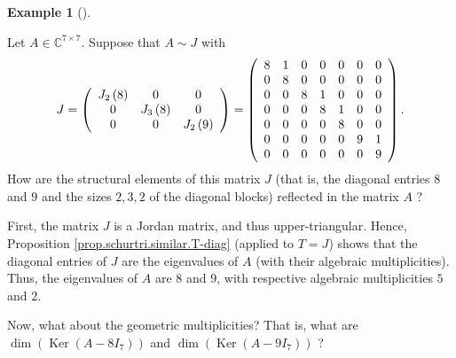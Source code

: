 \documentclass[numbers=enddot,12pt,final,onecolumn,notitlepage]{scrartcl}%
\numberwithin{exer}{subsection}
\theoremstyle{definition}
\newtheorem{exam}[theo]{Example}
\newenvironment{example}[1][]
{\begin{exam}[#1]\begin{leftbar}}
{\end{leftbar}\end{exam}}
\begin{document}
\begin{example}
\label{exa.jnf.unique.exa1}Let $A\in\mathbb{C}^{7\times7}$. Suppose that
$A\sim J$ with%
\[
J=\left(
\begin{array}
[c]{ccc}%
J_{2}\left(  8\right)  & 0 & 0\\
0 & J_{3}\left(  8\right)  & 0\\
0 & 0 & J_{2}\left(  9\right)
\end{array}
\right)  =\left(
\begin{array}
[c]{ccccccc}%
8 & 1 & 0 & 0 & 0 & 0 & 0\\
0 & 8 & 0 & 0 & 0 & 0 & 0\\
0 & 0 & 8 & 1 & 0 & 0 & 0\\
0 & 0 & 0 & 8 & 1 & 0 & 0\\
0 & 0 & 0 & 0 & 8 & 0 & 0\\
0 & 0 & 0 & 0 & 0 & 9 & 1\\
0 & 0 & 0 & 0 & 0 & 0 & 9
\end{array}
\right)  .
\]
How are the structural elements of this matrix $J$ (that is, the diagonal
entries $8$ and $9$ and the sizes $2,3,2$ of the diagonal blocks) reflected in
the matrix $A$ ?

First, the matrix $J$ is a Jordan matrix, and thus upper-triangular. Hence,
Proposition \ref{prop.schurtri.similar.T-diag} (applied to $T=J$) shows that
the diagonal entries of $J$ are the eigenvalues of $A$ (with their algebraic
multiplicities). Thus, the eigenvalues of $A$ are $8$ and $9$, with respective
algebraic multiplicities $5$ and $2$.

Now, what about the geometric multiplicities? That is, what are $\dim\left(
\operatorname*{Ker}\left(  A-8I_{7}\right)  \right)  $ and $\dim\left(
\operatorname*{Ker}\left(  A-9I_{7}\right)  \right)  $ ?


\end{example}
\end{document}
